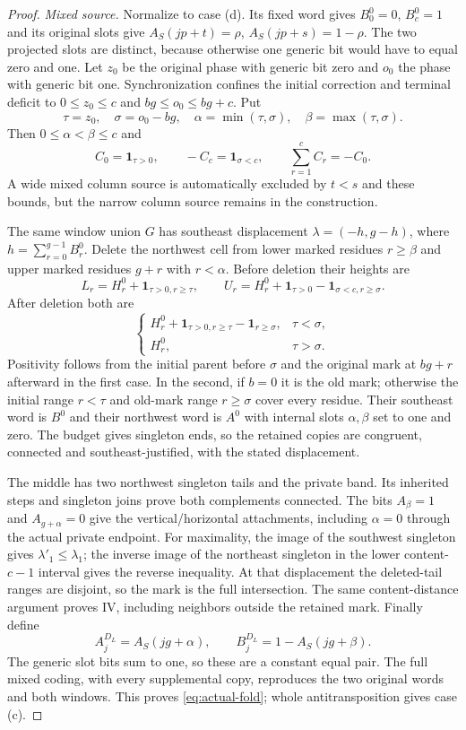 \documentclass[11pt,a4paper]{amsart}
\numberwithin{equation}{section}
\theoremstyle{plain}
\theoremstyle{definition}
\newcommand{\one}{\mathbf1}
\begin{document}
\begin{proof}
\smallskip\noindent\emph{Mixed source.}
Normalize to case (d).  Its fixed word gives \(B_0^0=0\), \(B_c^0=1\) and
its original slots give \(A_S(jp+t)=\rho\), \(A_S(jp+s)=1-\rho\).
The two projected slots are distinct, because otherwise one generic bit
would have to equal zero and one.  Let \(z_0\) be the original phase with
generic bit zero and \(o_0\) the phase with generic bit one.  Synchronization
confines the initial correction and terminal deficit to
\(0\le z_0\le c\) and \(bg\le o_0\le bg+c\).  Put
\[
 \tau=z_0,\quad\sigma=o_0-bg,\quad
 \alpha=\min(\tau,\sigma),\quad\beta=\max(\tau,\sigma).
\]
Then \(0\le\alpha<\beta\le c\) and
\[
 C_0=\one_{\tau>0},\qquad -C_c=\one_{\sigma<c},\qquad
 \sum_{r=1}^c C_r=-C_0.
\]
A wide mixed column source is automatically excluded by \(t<s\) and these
bounds, but the narrow column source remains in the construction.

The same window union \(G\) has southeast displacement
\(\lambda=(-h,g-h)\), where \(h=\sum_{r=0}^{g-1}B_r^0\).
Delete the northwest cell from lower marked residues \(r\ge\beta\) and
upper marked residues \(g+r\) with \(r<\alpha\).  Before deletion their heights
are
\[
 L_r=H_r^0+\one_{\tau>0,r\ge\tau},\qquad
 U_r=H_r^0+\one_{\tau>0}-\one_{\sigma<c,r\ge\sigma}.
\]
After deletion both are
\[
 \begin{cases}
 H_r^0+\one_{\tau>0,r\ge\tau}-\one_{r\ge\sigma},&\tau<\sigma,\\
 H_r^0,&\tau>\sigma.
 \end{cases}
\]
Positivity follows from the initial parent before \(\sigma\) and the original
mark at \(bg+r\) afterward in the first case.  In the second, if \(b=0\) it
is the old mark; otherwise the initial range \(r<\tau\) and old-mark range
\(r\ge\sigma\) cover every residue.  Their southeast word is \(B^0\) and
their northwest word is \(A^0\) with internal slots \(\alpha,\beta\) set to
one and zero.  The budget gives singleton ends, so the retained copies are
congruent, connected and southeast-justified, with the stated displacement.

The middle has two northwest singleton tails and the private band.  Its
inherited steps and singleton joins prove both complements connected.  The
bits \(A_\beta=1\) and \(A_{g+\alpha}=0\) give the vertical/horizontal
attachments, including \(\alpha=0\) through the actual private endpoint.
For maximality, the image of the southwest singleton gives
\(\lambda'_1\le\lambda_1\); the inverse image of the northeast singleton
in the lower content-\(c-1\) interval gives the reverse inequality.  At that
displacement the deleted-tail ranges are disjoint, so the mark is the full
intersection.  The same content-distance argument proves IV, including
neighbors outside the retained mark.  Finally define
\[
 A_j^{D_L}=A_S(jg+\alpha),\qquad
 B_j^{D_L}=1-A_S(jg+\beta).
\]
The generic slot bits sum to one, so these are a constant equal pair.
The full mixed coding, with every supplemental copy, reproduces the two
original words and both windows.  This proves \eqref{eq:actual-fold};
whole antitransposition gives case (c).


\end{proof}
\end{document}

